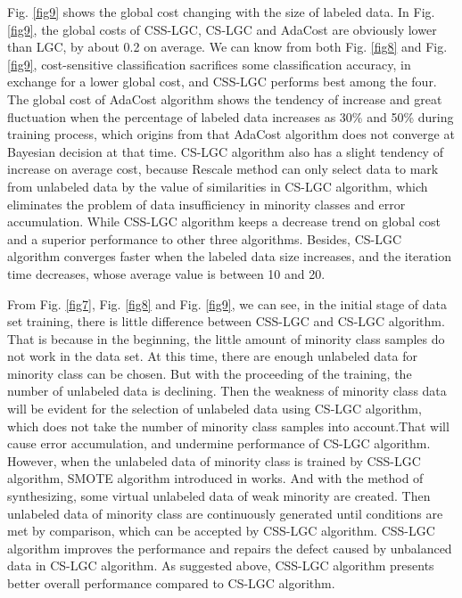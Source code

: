 \documentclass{svjour3}                     %
\begin{document}
Fig. \ref{fig9} shows the global cost changing with the size of labeled data. In Fig. \ref{fig9}, the global costs of CSS-LGC, CS-LGC and AdaCost are obviously lower than LGC, by about 0.2 on average. We can know from both Fig. \ref{fig8} and Fig. \ref{fig9}, cost-sensitive classification sacrifices some classification accuracy, in exchange for a lower global cost, and CSS-LGC performs best among the four.
The global cost of AdaCost algorithm shows the tendency of increase and great fluctuation when the percentage of labeled data increases as 30\% and 50\% during training process, which origins from that AdaCost algorithm does not converge at Bayesian decision at that time. CS-LGC algorithm also has a slight tendency of increase on average cost, because Rescale method can only select data to mark from unlabeled data by the value of similarities in CS-LGC algorithm, which eliminates the problem of data insufficiency in minority classes and error accumulation. While CSS-LGC algorithm keeps a decrease trend on global cost and a superior performance to other three algorithms. Besides, CS-LGC algorithm converges faster when the labeled data size increases, and the iteration time decreases, whose average value is between 10 and 20. 

 From Fig. \ref{fig7}, Fig. \ref{fig8} and Fig. \ref{fig9}, we can see, in the initial stage of data set training, there is little difference between CSS-LGC and CS-LGC algorithm. That is because in the beginning, the little amount of minority class samples do not work in the data set. At this time, there are enough unlabeled data for minority class can be chosen. But with the proceeding of the training, the number of unlabeled data is declining. Then the weakness of minority class data will be evident for the selection of unlabeled data using CS-LGC algorithm, which does not take the number of minority class samples into account.That will cause error accumulation, and undermine performance of CS-LGC algorithm. However, when the unlabeled data of minority class is trained by CSS-LGC algorithm, SMOTE algorithm introduced in works. And with the method of synthesizing, some virtual unlabeled data of weak minority are created. Then unlabeled data of minority class are continuously generated until conditions are met by comparison, which can be accepted by CSS-LGC algorithm. CSS-LGC algorithm improves the performance and repairs the defect caused by unbalanced data in CS-LGC algorithm. As suggested above, CSS-LGC algorithm presents better overall performance compared to CS-LGC algorithm.
\end{document}
